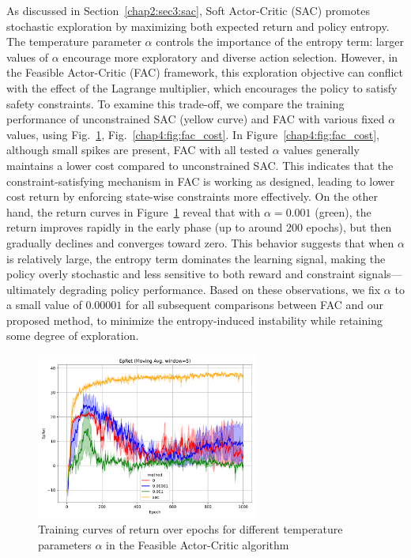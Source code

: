 As discussed in Section~\ref{chap2:sec3:sac}, Soft Actor-Critic (SAC) promotes stochastic exploration by maximizing both expected return and policy entropy. 
The temperature parameter $\alpha$ controls the importance of the entropy term: larger values of $\alpha$ encourage more exploratory and diverse action selection.
However, in the Feasible Actor-Critic (FAC) framework, this exploration objective can conflict with the effect of the Lagrange multiplier, which encourages the policy to satisfy safety constraints.
To examine this trade-off, we compare the training performance of unconstrained SAC (yellow curve) and FAC with various fixed $\alpha$ values, using Fig.~\ref{chap4:fig:fac_return}, Fig.~\ref{chap4:fig:fac_cost}.
In Figure~\ref{chap4:fig:fac_cost}, although small spikes are present, FAC with all tested $\alpha$ values generally maintains a lower cost compared to unconstrained SAC.
This indicates that the constraint-satisfying mechanism in FAC is working as designed, leading to lower cost return by enforcing state-wise constraints more effectively.
On the other hand, the return curves in Figure~\ref{chap4:fig:fac_return} reveal that with $\alpha = 0.001$ (green), the return improves rapidly in the early phase (up to around 200 epochs), but then gradually declines and converges toward zero.
This behavior suggests that when $\alpha$ is relatively large, the entropy term dominates the learning signal, making the policy overly stochastic and less sensitive to both reward and constraint signals—ultimately degrading policy performance.
Based on these observations, we fix $\alpha$ to a small value of $0.00001$ for all subsequent comparisons between FAC and our proposed method, to minimize the entropy-induced instability while retaining some degree of exploration.

\begin{figure}[h]
  \centering
  \includegraphics[width=0.65\textwidth]{imgs/chap4/fac/return.pdf}
  \caption{Training curves of return over epochs for different temperature parameters $\alpha$ in the Feasible Actor-Critic algorithm}
  \label{chap4:fig:fac_return}
\end{figure}


